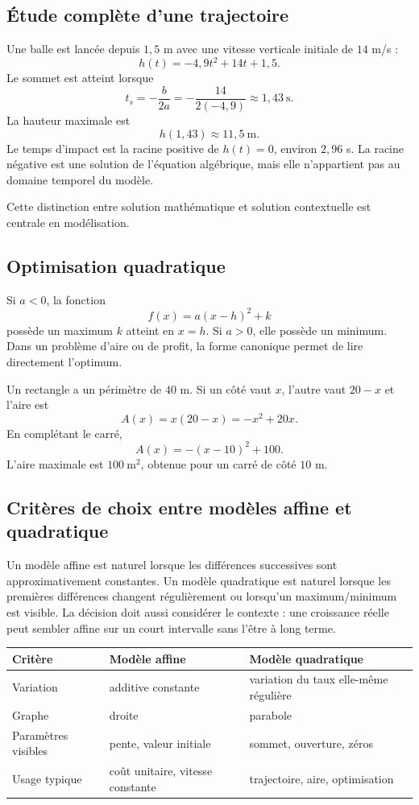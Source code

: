 \documentclass[12pt,a4paper,openany]{book}
\begin{document}
\subsection{Étude complète d'une trajectoire}

Une balle est lancée depuis $1{,}5$ m avec une vitesse verticale initiale de $14$ m/s :
\[
h(t)=-4{,}9t^2+14t+1{,}5.
\]
Le sommet est atteint lorsque
\[
t_s=-\frac b{2a}=-\frac{14}{2(-4{,}9)}\approx1{,}43\ \mathrm{s}.
\]
La hauteur maximale est
\[
h(1{,}43)\approx11{,}5\ \mathrm{m}.
\]
Le temps d'impact est la racine positive de $h(t)=0$, environ $2{,}96$ s. La racine négative est une solution de l'équation algébrique, mais elle n'appartient pas au domaine temporel du modèle.

Cette distinction entre solution mathématique et solution contextuelle est centrale en modélisation.

\subsection{Optimisation quadratique}

Si $a<0$, la fonction
\[
f(x)=a(x-h)^2+k
\]
possède un maximum $k$ atteint en $x=h$. Si $a>0$, elle possède un minimum. Dans un problème d'aire ou de profit, la forme canonique permet de lire directement l'optimum.

\begin{examplebox}
Un rectangle a un périmètre de $40$ m. Si un côté vaut $x$, l'autre vaut $20-x$ et l'aire est
\[
A(x)=x(20-x)=-x^2+20x.
\]
En complétant le carré,
\[
A(x)=-(x-10)^2+100.
\]
L'aire maximale est $100\ \mathrm{m}^2$, obtenue pour un carré de côté $10$ m.
\end{examplebox}

\subsection{Critères de choix entre modèles affine et quadratique}

Un modèle affine est naturel lorsque les différences successives sont approximativement constantes. Un modèle quadratique est naturel lorsque les premières différences changent régulièrement ou lorsqu'un maximum/minimum est visible. La décision doit aussi considérer le contexte : une croissance réelle peut sembler affine sur un court intervalle sans l'être à long terme.

\begin{center}
\begin{tabularx}{\textwidth}{@{}lYY@{}}
\toprule
Critère & Modèle affine & Modèle quadratique\\\midrule
Variation & additive constante & variation du taux elle-même régulière\\
Graphe & droite & parabole\\
Paramètres visibles & pente, valeur initiale & sommet, ouverture, zéros\\
Usage typique & coût unitaire, vitesse constante & trajectoire, aire, optimisation\\
\bottomrule
\end{tabularx}
\end{center}
\end{document}
